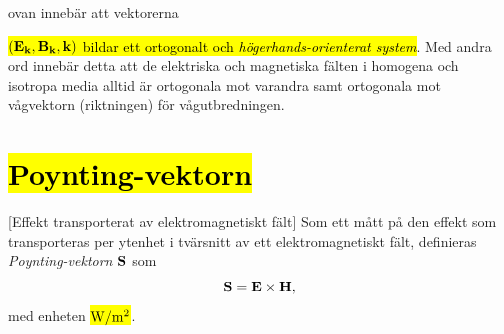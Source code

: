 ovan inneb{\"a}r att vektorerna {\hl{$({\bf E}_{\bf k},{\bf B}_{\bf k},{\bf k})$
bildar ett ortogonalt och {\it h{\"o}gerhands-orienterat system}}.
Med andra ord inneb{\"a}r detta att de elektriska och magnetiska f{\"a}lten i
homogena och isotropa media alltid {\"a}r ortogonala mot varandra samt
ortogonala mot v{\aa}gvektorn (riktningen) f{\"o}r v{\aa}gutbredningen.

\section{{\hl{Poynting-vektorn}}}
[Effekt transporterat av elektromagnetiskt
  f{\"a}lt]
Som ett m{\aa}tt p{\aa} den effekt som transporteras per ytenhet i
tv{\"a}rsnitt av ett elektromagnetiskt f{\"a}lt, definieras
{\it Poynting-vektorn} ${\bf S}$ som
\hl{$$
  {\bf S}={\bf E}\times{\bf H},
$$}
med enheten {\hl{${\rm W}/{\rm m}^2$}}.
\vfill\eject

}

